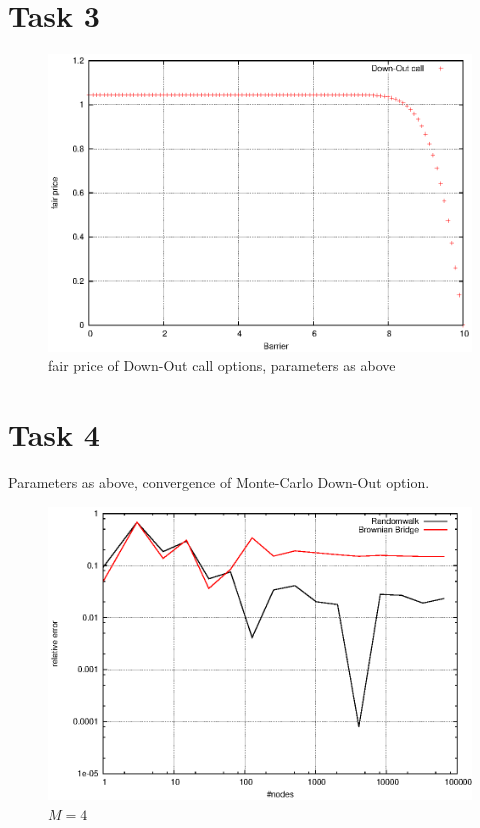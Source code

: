 \documentclass[]{article}
\begin{document}
\section*{Task 3}
\begin{figure}[!ht]
\centering
\includegraphics[width=.9\textwidth]{task3.eps}
\caption{fair price of Down-Out call options, parameters as above}
\label{fig:Task3}
\end{figure}
\clearpage


\section*{Task 4}
Parameters as above, convergence of Monte-Carlo Down-Out option.
\begin{figure}[!ht]
\centering
\includegraphics[width=.9\textwidth]{task4_mc_4.eps}
\caption{$M=4$}
\label{fig:Task4a}
\end{figure}
\end{document}
